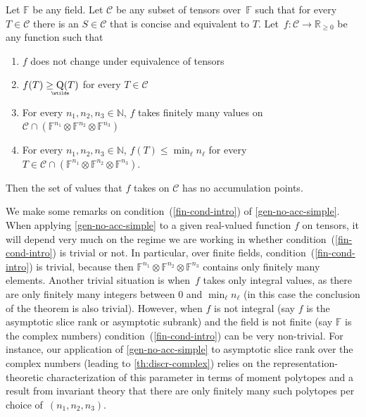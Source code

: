 \documentclass{daj}
\DeclareMathOperator{\asympsubrank}{\underaccent{\wtilde}{Q}}
\newcommand{\FF}{\mathbb{F}}
\newcommand{\RR}{\mathbb{R}}
\newcommand{\NN}{\mathbb{N}}
\begin{document}
\begin{theorem}\label{gen-no-acc-simple}
    Let $\FF$ be any field. Let $\mathcal{C}$ be any subset of tensors over~$\FF$ such that for every $T \in \mathcal{C}$ there is an $S \in \mathcal{C}$ that is concise and equivalent to $T$.
    Let~$f : \mathcal{C} \to \RR_{\geq0}$ be any function such that
    \begin{enumerate}[\upshape (i)]
    \item $f$ does not change under equivalence of tensors
    \item\label{lb-cond-intro} $f(T) \geq \asympsubrank(T)$ for every $T \in \mathcal{C}$
    \item\label{fin-cond-intro} For every $n_1, n_2, n_3\in \NN$,  $f$ takes finitely many values on $\mathcal{C} \cap (\FF^{n_1} \otimes \FF^{n_2} \otimes \FF^{n_3})$ 
    \item For every $n_1, n_2, n_3\in \NN$, $f(T) \leq \min_\ell n_\ell$ for every $T \in \mathcal{C} \cap (\FF^{n_1} \otimes \FF^{n_2} \otimes \FF^{n_3})$.
    \end{enumerate}
    Then the set of values that $f$ takes on $\mathcal{C}$ has no accumulation points.
\end{theorem}


%

We make some remarks on condition~(\ref{fin-cond-intro}) of \autoref{gen-no-acc-simple}.
When applying \autoref{gen-no-acc-simple} to a given real-valued function $f$ on tensors, it will depend very much on the regime we are working in whether condition~(\ref{fin-cond-intro}) is trivial or not. In particular, over finite fields, condition~(\ref{fin-cond-intro}) is trivial, because then $\FF^{n_1} \otimes \FF^{n_2} \otimes \FF^{n_3}$ contains only finitely many elements. 
Another trivial situation is when~$f$ takes only integral values, as there are only finitely many integers between 0 and $\min_\ell n_\ell$ (in this case the conclusion of the theorem is also trivial). 
However, when $f$ is not integral (say $f$ is the asymptotic slice rank or asymptotic subrank) and the field is not finite (say $\FF$ is the complex numbers) condition~(\ref{fin-cond-intro}) can be very non-trivial. 
For instance, our application of \autoref{gen-no-acc-simple} to asymptotic slice rank over the complex numbers (leading to \autoref{th:discr-complex}) relies on the representation-theoretic characterization of this parameter in terms of moment polytopes \cite{MR4495838} and a result from invariant theory that there are only finitely many such polytopes per choice of~$(n_1, n_2, n_3)$.
\end{document}
